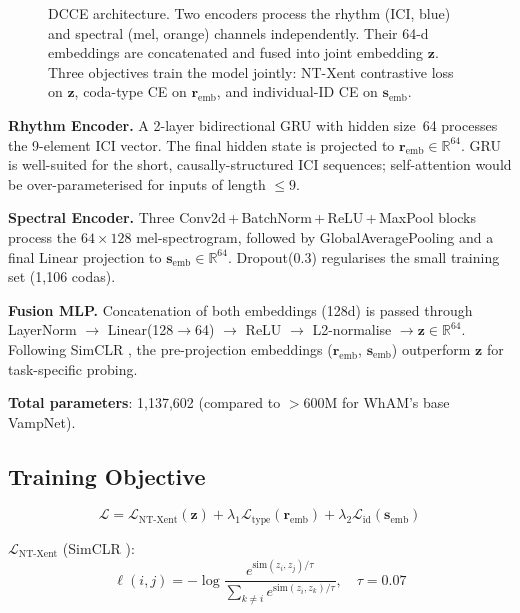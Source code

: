 \documentclass[9pt,a4paper,twocolumn,twoside]{rho-class/rho}
\begin{document}
\begin{figure}[H]
\caption{DCCE architecture. Two encoders process the rhythm (ICI, blue) and spectral (mel, orange) channels independently. Their 64-d embeddings are concatenated and fused into joint embedding $\mathbf{z}$. Three objectives train the model jointly: NT-Xent contrastive loss on $\mathbf{z}$, coda-type CE on $\mathbf{r}_\text{emb}$, and individual-ID CE on $\mathbf{s}_\text{emb}$.}
\label{fig:architecture}
\end{figure}

\textbf{Rhythm Encoder.} A 2-layer bidirectional GRU with hidden size~64 processes the 9-element ICI vector. The final hidden state is projected to $\mathbf{r}_\text{emb} \in \mathbb{R}^{64}$. GRU is well-suited for the short, causally-structured ICI sequences; self-attention would be over-parameterised for inputs of length $\leq 9$.

\textbf{Spectral Encoder.} Three Conv2d\,+\,BatchNorm\,+\,ReLU\,+\,MaxPool blocks process the $64\!\times\!128$ mel-spectrogram, followed by GlobalAveragePooling and a final Linear projection to $\mathbf{s}_\text{emb} \in \mathbb{R}^{64}$. Dropout(0.3) regularises the small training set (1,106 codas).

\textbf{Fusion MLP.} Concatenation of both embeddings (128d) is passed through LayerNorm $\to$ Linear(128$\to$64) $\to$ ReLU $\to$ L2-normalise $\to \mathbf{z} \in \mathbb{R}^{64}$. Following SimCLR \cite{chen2020simclr}, the pre-projection embeddings ($\mathbf{r}_\text{emb}$, $\mathbf{s}_\text{emb}$) outperform $\mathbf{z}$ for task-specific probing.

\textbf{Total parameters}: 1,137,602 (compared to $>$600M for WhAM's base VampNet).

\subsection{Training Objective}

\begin{equation}
\mathcal{L} = \mathcal{L}_\text{NT-Xent}(\mathbf{z}) + \lambda_1 \mathcal{L}_\text{type}(\mathbf{r}_\text{emb}) + \lambda_2 \mathcal{L}_\text{id}(\mathbf{s}_\text{emb})
\end{equation}

\textbf{$\mathcal{L}_\text{NT-Xent}$} (SimCLR \cite{chen2020simclr}):
\begin{equation}
\ell(i,j) = -\log \frac{e^{\mathrm{sim}(z_i, z_j)/\tau}}{\sum_{k\neq i} e^{\mathrm{sim}(z_i, z_k)/\tau}}, \quad \tau=0.07
\end{equation}
\end{document}
